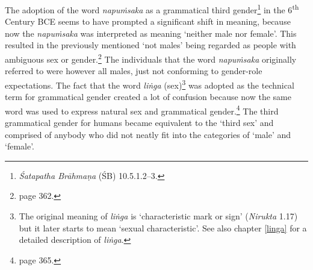 The adoption of the word \textit{napuṁsaka} as a grammatical third gender\footnote{\textit{Śatapatha Brāhmaṇa} (ŚB) 10.5.1.2–3.} in the 6\textsuperscript{th} Century BCE seems to have prompted a significant shift in meaning, because now the \textit{napuṁsaka} was interpreted as meaning `neither male nor female'. This resulted in the previously mentioned `not males' being regarded as people with ambiguous sex or gender.\footnote{\cite{zwilling2000} page 362.} The individuals that the word \textit{napuṁsaka} originally referred to were however all males, just not conforming to gender-role expectations. The fact that the word \textit{liṅga} (sex)\footnote{The original meaning of \textit{liṅga} is `characteristic mark or sign' (\textit{Nirukta} 1.17) but it later starts to mean `sexual characteristic'. See also chapter \ref{linga} for a detailed description of \textit{liṅga}.} was adopted as the technical term for grammatical gender created a lot of confusion because now the same word was used to express natural sex and grammatical gender.\footnote{\cite{zwilling} page 365.} The third grammatical gender for humans became equivalent to the `third sex' and comprised of anybody who did not neatly fit into the categories of `male' and `female'.


